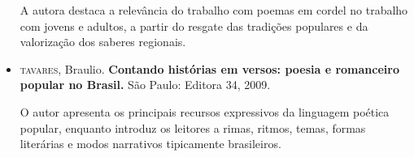 \documentclass[12pt]{extarticle}
\begin{document}
\begin{itemize}
A autora destaca a relevância do trabalho com poemas em cordel no
trabalho com jovens e adultos, a partir do resgate das tradições
populares e da valorização dos saberes regionais.


\item \textsc{tavares}, Braulio. \textbf{Contando histórias em versos: poesia e
romanceiro popular no Brasil.} São Paulo: Editora 34, 2009.

O autor apresenta os principais recursos expressivos da linguagem
poética popular, enquanto introduz os leitores a rimas, ritmos, temas,
formas literárias e modos narrativos tipicamente brasileiros.

\end{itemize}
\end{document}
